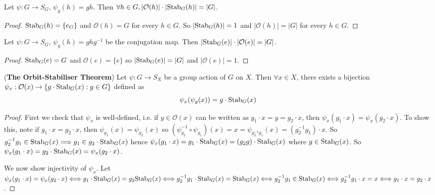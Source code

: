 \begin{lemma}
	Let $\psi: G \to S_G$, $\psi_g(h) = gh$. Then $\forall h \in G, |\mathcal{O}(h)| \cdot |\text{Stab}_G(h)| = |G|$.
\end{lemma}

\begin{proof}
	$\text{Stab}_G(h) = \{ e_G \}$ and $\mathcal{O}(h) = G$ for every $h \in G$. So $|\text{Stab}_G(h)| = 1$ and $|\mathcal{O}(h)| = |G|$ for every $h \in G$.
\end{proof}

\begin{lemma}
	Let $\psi: G \to S_G$, $\psi_g(h) = gh g^{-1}$ be the conjugation map. Then $|\text{Stab}_G(e)| \cdot |\mathcal{O}(e)| = |G|$.
\end{lemma}

\begin{proof}
	$\text{Stab}_G(e) = G$ and $\mathcal{O}(e) = \{ e \}$ so $|\text{Stab}_G(e)| = |G|$ and $|\mathcal{O}(e)| = 1$.
\end{proof}

\begin{theorem}\label{thm:orbitStabiliser}
	(\textbf{The Orbit-Stabiliser Theorem}) Let $\psi: G \to S_X$ be a group action of $G$ on $X$. Then $\forall x \in X$, there exists a bijection $\psi_x: \mathcal{O}(x) \to \{ g \cdot \text{Stab}_G(x): g \in G \}$ defined as
	\[
		\psi_x(\psi_g(x)) = g \cdot \text{Stab}_G(x)
	\]
\end{theorem}

\begin{proof}
	First we check that $\psi_x$ is well-defined, i.e. if $y \in \mathcal{O}(x)$ can be written as $g_1 \cdot x = y = g_2 \cdot x$, then $\psi_x(g_1 \cdot x) = \psi_x(g_2 \cdot x)$. To show this, note if $g_1 \cdot x = g_2 \cdot x$, then $\psi_{g_1}(x) = \psi_{g_2}(x)$ so $(\psi_{g_2}^{-1} \circ \psi_{g_1}) (x) = x = \psi_{g_2^{-1} g_1}(x) = (g_2^{-1} g_1) \cdot x$. So $g_2^{-1} g_1 \in \text{Stab}_G(x) \Longrightarrow g_1 \in g_2 \cdot \text{Stab}_G(x)$ hence $\psi_x(g_1 \cdot x) = g_1 \cdot \text{Stab}_G(x) = (g_2 g) \cdot \text{Stab}_G(x)$ where $g \in \text{Stab}_G(x)$. So $\psi_x(g_1 \cdot x) = g_2 \cdot \text{Stab}_G(x) = \psi_x(g_2 \cdot x)$.

	We now show injectivity of $\psi_x$. Let $\psi_x(g_1 \cdot x) = \psi_x(g_2 \cdot x) \Longleftrightarrow g_1 \cdot \text{Stab}_G(x) = g_2 \text{Stab}_G(x) \Longleftrightarrow g_2^{-1} g_1 \cdot \text{Stab}_G(x) = \text{Stab}_G(x) \Longleftrightarrow g_2^{-1} g_1 \in \text{Stab}_G(x) \Longleftrightarrow g_2^{-1} g_1 \cdot x = x \Longleftrightarrow g_1 \cdot x = g_2 \cdot x$.
\end{proof}

